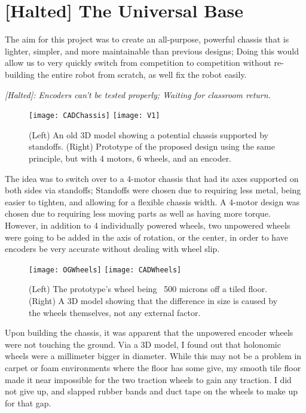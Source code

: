 \section{[Halted] The Universal Base}

The aim for this project was to create an all-purpose, powerful chassis that is lighter, simpler, and more maintainable than previous designs; Doing this would allow us to very quickly switch from competition to competition without re-building the entire robot from scratch, as well fix the robot easily.

\textit{[Halted]: Encoders can't be tested properly; Waiting for classroom return.}

\begin{figure}[h]
    \centering
    \texttt{[image: CADChassis]}
    \texttt{[image: V1]}
    \caption{
        (Left) An old 3D model showing a potential chassis supported by standoffs. (Right) Prototype of the proposed design using the same principle, but with 4 motors, 6 wheels, and an encoder.
    }
\end{figure}

The idea was to switch over to a 4-motor chassis that had its axes supported on both sides via standoffs; Standoffs were chosen due to requiring less metal, being easier to tighten, and allowing for a flexible chassis width. A 4-motor design was chosen due to requiring less moving parts as well as having more torque. However, in addition to 4 individually powered wheels, two unpowered wheels were going to be added in the axis of rotation, or the center, in order to have encoders be very accurate without dealing with wheel slip.

\begin{figure}[h]
    \centering
    \texttt{[image: OGWheels]}
    \texttt{[image: CADWheels]}
    \caption{
        (Left) The prototype's wheel being ~500 microns off a tiled floor. (Right) A 3D model showing that the difference in size is caused by the wheels themselves, not any external factor.
    }
\end{figure}

Upon building the chassis, it was apparent that the unpowered encoder wheels were not touching the ground. Via a 3D model, I found out that holonomic wheels were a millimeter bigger in diameter. While this may not be a problem in carpet or foam environments where the floor has some give, my smooth tile floor made it near impossible for the two traction wheels to gain any traction. I did not give up, and slapped rubber bands and duct tape on the wheels to make up for that gap.

